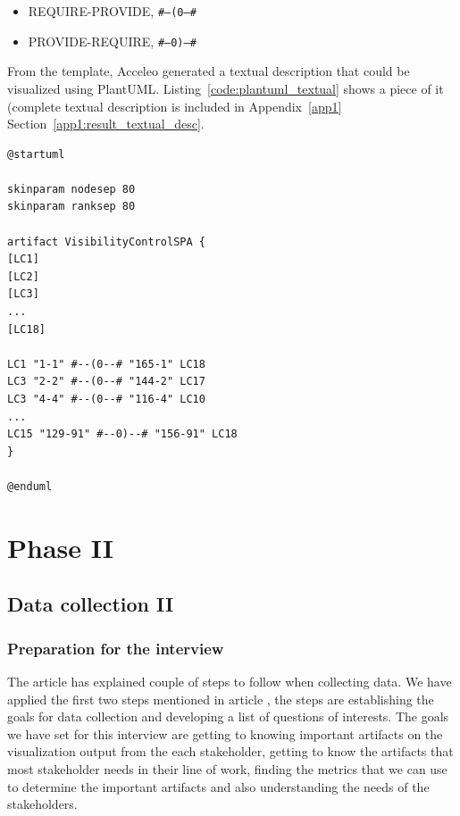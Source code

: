 \begin{itemize}
    \item REQUIRE-PROVIDE, \texttt{\#--(0--\#}
    \item PROVIDE-REQUIRE, \texttt{\#--0)--\#}
\end{itemize}

From the template, Acceleo generated a textual description that could be visualized using PlantUML. Listing~\ref{code:plantuml_textual} shows a piece of it (complete textual description is included in Appendix~\ref{app1} Section~\ref{app1:result_textual_desc}.

\begin{lstlisting}[caption=A piece of textual representation generated from Acceleo template engine,label=code:plantuml_textual]
@startuml

skinparam nodesep 80
skinparam ranksep 80

artifact VisibilityControlSPA {
[LC1]
[LC2]
[LC3]
...
[LC18]

LC1 "1-1" #--(0--# "165-1" LC18
LC3 "2-2" #--(0--# "144-2" LC17
LC3 "4-4" #--(0--# "116-4" LC10
...
LC15 "129-91" #--0)--# "156-91" LC18
}

@enduml
\end{lstlisting}


\section{Phase II}

\subsection{Data collection II}

\subsubsection{Preparation for the interview}
The article \cite{Basili} has explained couple of steps to follow when collecting data. We have applied the first two steps mentioned in article \cite{Basili}, the steps are establishing the goals for data collection and developing a list of questions of interests. The goals we have set for this interview are getting to knowing important artifacts on the visualization output from the each stakeholder, getting to know the artifacts that most stakeholder needs in their line of work, finding the metrics that we can use to determine the important artifacts and also understanding the needs of the stakeholders. 

